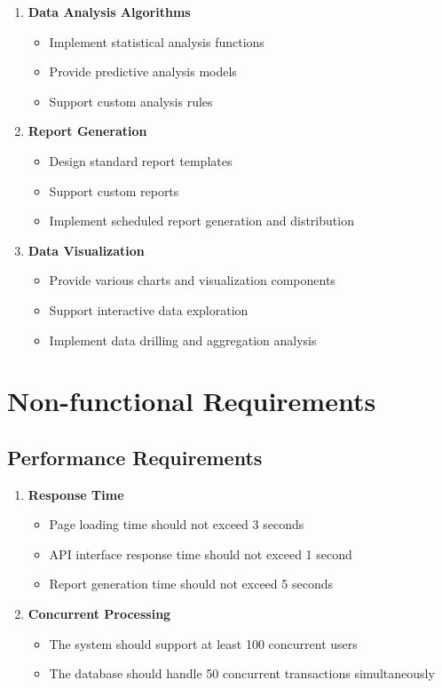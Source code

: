 \documentclass[a4paper,12pt]{article}
\begin{document}
\begin{enumerate}
  \item \textbf{Data Analysis Algorithms}
  \begin{itemize}
    \item Implement statistical analysis functions
    \item Provide predictive analysis models
    \item Support custom analysis rules
  \end{itemize}
  
  \item \textbf{Report Generation}
  \begin{itemize}
    \item Design standard report templates
    \item Support custom reports
    \item Implement scheduled report generation and distribution
  \end{itemize}
  
  \item \textbf{Data Visualization}
  \begin{itemize}
    \item Provide various charts and visualization components
    \item Support interactive data exploration
    \item Implement data drilling and aggregation analysis
  \end{itemize}
\end{enumerate}

\section{Non-functional Requirements}

\subsection{Performance Requirements}

\begin{enumerate}
  \item \textbf{Response Time}
  \begin{itemize}
    \item Page loading time should not exceed 3 seconds
    \item API interface response time should not exceed 1 second
    \item Report generation time should not exceed 5 seconds
  \end{itemize}
  
  \item \textbf{Concurrent Processing}
  \begin{itemize}
    \item The system should support at least 100 concurrent users
    \item The database should handle 50 concurrent transactions simultaneously
  \end{itemize}
  
\end{enumerate}
\end{document}
